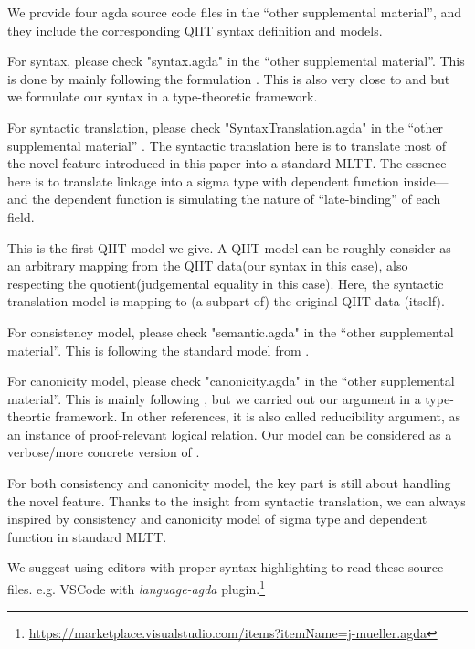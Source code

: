 We provide four agda source code files in the ``other supplemental material'', and they include the corresponding QIIT syntax definition and models. 

For syntax, please check "syntax.agda" in the ``other supplemental material''. This is done by mainly following the formulation \citet{altkap2016}. This is also very close to \citet{coquand2018canonicity} and \citet{sterling2019algebraic} but we formulate our syntax in a type-theoretic framework.

For syntactic translation, please check "SyntaxTranslation.agda" in the ``other supplemental material'' . The syntactic translation here is to translate most of the novel feature introduced in this paper into a standard MLTT. 
The essence here is to translate linkage into a sigma type  with dependent function inside---and the dependent function is simulating the nature of ``late-binding'' of each field.


This is the first QIIT-model we give. A QIIT-model can be roughly consider as an arbitrary mapping from the QIIT data(our syntax in this case), also respecting the quotient(judgemental equality in this case). Here, the syntactic translation model is mapping to (a subpart of) the original QIIT data (itself). 

For consistency model, please check "semantic.agda" in the ``other supplemental material''. This is following the standard model from \citet{altkap2016,kaposi2017type,kaposi2019gluing}.

For canonicity model, please check "canonicity.agda" in the ``other supplemental material''. This is mainly following \citet{coquand2018canonicity,sterling2019algebraic}, but we carried out our argument in a type-theortic framework.  In other references, it is also called reducibility argument, as an instance of proof-relevant logical relation. Our model can be considered as a verbose/more concrete version of \citet{kaposi2019gluing}.

For both consistency and canonicity model, the key part is still about handling the novel feature. Thanks to the insight from syntactic translation, we can always inspired by consistency and canonicity model of sigma type and dependent function in standard MLTT.

We suggest using editors with proper syntax highlighting to read these source files. e.g. VSCode with \textit{language-agda} plugin.\footnote{\url{https://marketplace.visualstudio.com/items?itemName=j-mueller.agda}} 
